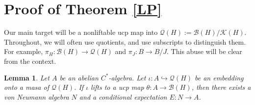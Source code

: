 \documentclass[10pt]{amsart}
\newtheorem{lem}[thm]{Lemma}
\theoremstyle{definition}
\begin{document}
\section{Proof of Theorem \ref{LP}}

Our main target will be a nonliftable ucp map into $\mathscr{Q}(H):=\mathscr{B}(H)/\mathscr{K}(H)$. Throughout, we will often use quotients, and use subscripts to distinguish them. For example, $\pi_H:\mathscr{B}(H)\rightarrow\mathscr{Q}(H)$ and $\pi_J:B\rightarrow B/J$. This abuse will be clear from the context.

\begin{lem}\label{exp}
    Let $A$ be an abelian $C^*$-algebra. Let $\iota:A\hookrightarrow\mathscr{Q}(H)$ be an embedding onto a masa of $\mathscr{Q}(H)$. If $\iota$ lifts to a ucp map $\theta:A\rightarrow\mathscr{B}(H)$, then there exists a von Neumann algebra $N$ and a conditional expectation $E:N\rightarrow A$.
\end{lem}
\end{document}
